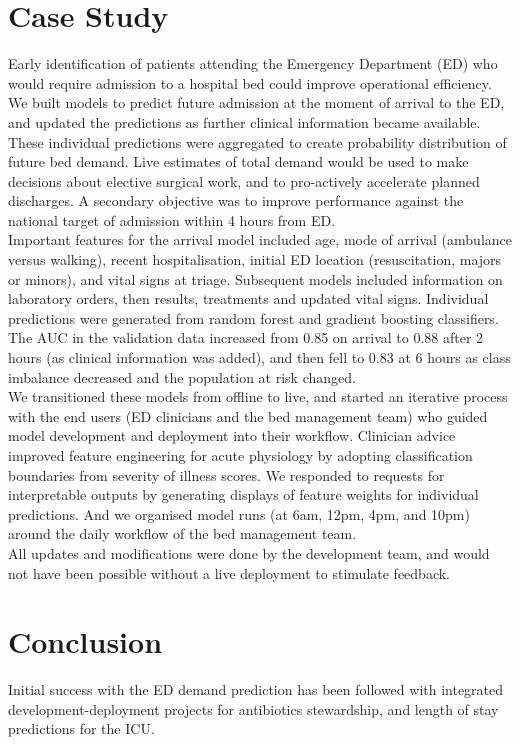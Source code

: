 \documentclass[pmlr,twocolumn,10pt]{jmlr} %
\begin{document}
\section{Case Study}
Early identification of patients attending the Emergency Department (ED) who would require admission to a hospital bed could improve operational efficiency. We built models to predict future admission at the moment of arrival to the ED, and updated the predictions as further clinical information became available. These individual predictions were aggregated to create probability distribution of future bed demand. Live estimates of total demand would be used to make decisions about elective surgical work, and to pro-actively accelerate planned discharges. 
A secondary objective was to improve performance against the national target of admission within 4 hours from ED.\citep{kings2021} \\
Important features for the arrival model included age, mode of arrival (ambulance versus walking), recent hospitalisation, initial ED location (resuscitation, majors or minors), and vital signs at triage. Subsequent models included information on laboratory orders, then results, treatments and updated vital signs. Individual predictions were generated from random forest and gradient boosting classifiers. The AUC in the validation data increased from 0.85 on arrival to 0.88 after 2 hours (as clinical information was added), and then fell to 0.83 at 6 hours as class imbalance decreased and the population at risk changed.\\
We transitioned these models from offline to live, and started an iterative process with the end users (ED clinicians and the bed management team) who guided model development and deployment into their workflow. Clinician advice improved feature engineering for acute physiology by adopting classification boundaries from severity of illness scores. We responded to requests for interpretable outputs by generating displays of feature weights for individual predictions. And we organised model runs (at 6am, 12pm, 4pm, and 10pm) around the daily workflow of the bed management team.\\
All updates and modifications were done by the development team, and would not have been possible without a live deployment to stimulate feedback.  

\section{Conclusion}
Initial success with the ED demand prediction has been followed with integrated development-deployment projects for antibiotics stewardship, and length of stay predictions for the ICU. 
\end{document}
